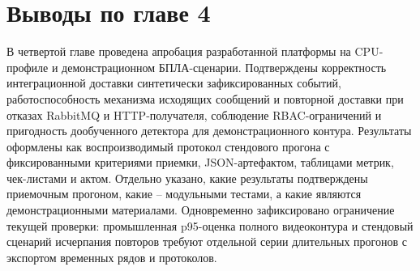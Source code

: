 \section*{Выводы по главе 4}

В четвертой главе проведена апробация разработанной платформы на CPU-профиле и демонстрационном БПЛА-сценарии. Подтверждены корректность интеграционной доставки синтетически зафиксированных событий, работоспособность механизма исходящих сообщений и повторной доставки при отказах RabbitMQ и HTTP-получателя, соблюдение RBAC-ограничений и пригодность дообученного детектора для демонстрационного контура. Результаты оформлены как воспроизводимый протокол стендового прогона с фиксированными критериями приемки, JSON-артефактом, таблицами метрик, чек-листами и актом. Отдельно указано, какие результаты подтверждены приемочным прогоном, какие -- модульными тестами, а какие являются демонстрационными материалами. Одновременно зафиксировано ограничение текущей проверки: промышленная p95-оценка полного видеоконтура и стендовый сценарий исчерпания повторов требуют отдельной серии длительных прогонов с экспортом временных рядов и протоколов.
